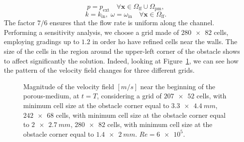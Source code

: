 \begin{equation}
	p = p_\text{ext} \quad \forall \mathbf{x} \in \Omega_\text{ff} \cup \Omega_\text{pm},
\end{equation}
\begin{equation}
	k = k_\text{in}, \; \omega = \omega_\text{in} \quad \forall \mathbf{x} \in \Omega_\text{ff}.
\end{equation}
The factor $7/6$ ensures that the flow rate is uniform along the channel.
Performing a sensitivity analysis, we choose a grid made of $\num{280x82}$ cells, employing gradings up to $1.2$ in order ho have refined cells near the walls. 
The size of the cells in the region around the upper-left corner of the obstacle shows to affect significantly the solution. Indeed, looking at Figure~\ref{fig:obstacle_grid}, we can see how the pattern of the velocity field changes for three different grids.

\begin{figure}
	\centering
	\hspace{0.008\textwidth}
	\hspace{0.008\textwidth}
	\caption[short text]{Magnitude of the velocity field $[\si{m/s}]$ near the beginning of the porous-medium, at $t=T$, considering a grid of
	\protect{} $\num{207x52}$ cells, with minimum cell size at the obstacle corner equal to $\SI{3.3x4.4}{mm}$, 
	\protect{} $\num{242x68}$ cells, with minimum cell size at the obstacle corner equal to $\SI{2x2.7}{mm}$,
	\protect{} $\num{280x82}$ cells, with minimum cell size at the obstacle corner equal to $\SI{1.4x2}{mm}$.	
	$Re=\num{6e5}$.}
	\label{fig:obstacle_grid}
\end{figure}

